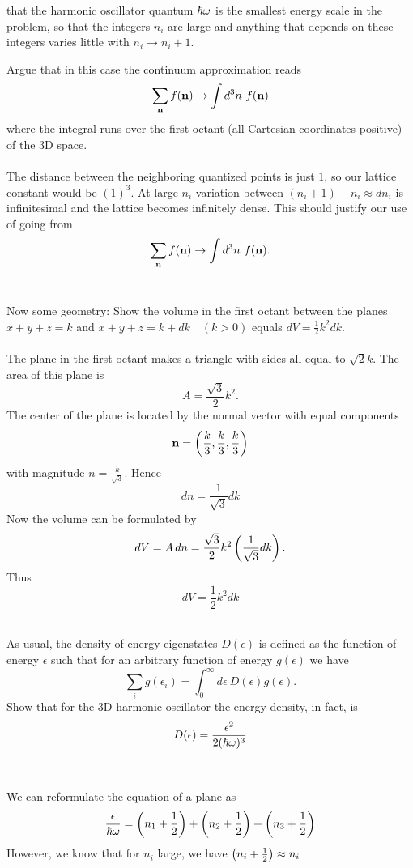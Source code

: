 \documentclass[11pt,letterpaper]{article}
\begin{document}
	that the harmonic oscillator quantum $\hbar\omega$ is the smallest energy scale in the problem,
	so that the integers $n_i$ are large and anything that depends on these integers varies little
	with $n_i\to n_i+1$.
	\benum
		\item
		Argue that in this case the continuum approximation reads
		\[
			\sum_{\mathbf{n}} f(\mathbf{n}) \to \int d^3n\ f(\mathbf{n})
		\]
		where the integral runs over the first octant (all Cartesian coordinates positive) of the 
		3D space.
		\\
		\\
		The distance between the neighboring quantized points is just $1$, so our lattice constant
		would be $(1)^3$. At large $n_i$ variation between $(n_i+1)-n_i\approx dn_i$ is infinitesimal and 
		the lattice becomes infinitely dense. This should justify our use of
		going from 
		\[
			\sum_{\mathbf{n}} f(\mathbf{n}) \to \int d^3n\ f(\mathbf{n}).
		\]
		\\
		\item
		Now some geometry: Show the volume in the first octant between the planes
		$x+y+z = k$ and $x+y+z =k+dk\quad (k>0)$ equals $dV = \frac{1}{2}k^2dk$.
		\\
		\\
		The plane in the first octant makes a triangle with sides all equal to $\sqrt 2k$. The area of 
		this plane is
		\[
			A = \frac{\sqrt 3}{2}k^2.
		\]
		The center of the plane is located by the normal vector with equal components
		\[
			\mathbf{n} = \left(\frac{k}{3},\frac{k}{3},\frac{k}{3}\right)
		\]
		with magnitude $n = \frac{k}{\sqrt 3}$. Hence
		\[
			dn = \frac{1}{\sqrt 3}dk
		\]
		Now the volume can be formulated by
		\[
			dV = A\,dn = \frac{\sqrt 3}{2}k^2\left(\frac{1}{\sqrt 3}dk\right).
		\]
		Thus 
		\[
			dV = \frac{1}{2}k^2dk
		\]
		\\
		\item
		As usual, the density of energy eigenstates $D(\epsilon)$ is defined as the function of 
		energy $\epsilon$ such that for an arbitrary function of energy $g(\epsilon)$ we have
		\[
			\sum_i g(\epsilon_i) = \int_0^\infty d\epsilon\ D(\epsilon)g(\epsilon).
		\]
		Show that for the 3D harmonic oscillator the energy density, in fact, is 
		\[
			D(\epsilon) = \frac{\epsilon^2}{2(\hbar\omega)^3}
		\]
		\\
		\\
		We can reformulate the equation of a plane as
		\[
			\frac{\epsilon}{\hbar\omega} = \left(n_1+\frac{1}{2}\right)
			+\left(n_2+\frac{1}{2}\right)
			+\left(n_3+\frac{1}{2}\right)
		\]
		However, we know that for $n_i$ large, we have $\left(n_i+\frac{1}{2}\right)\approx n_i$
\end{document}
